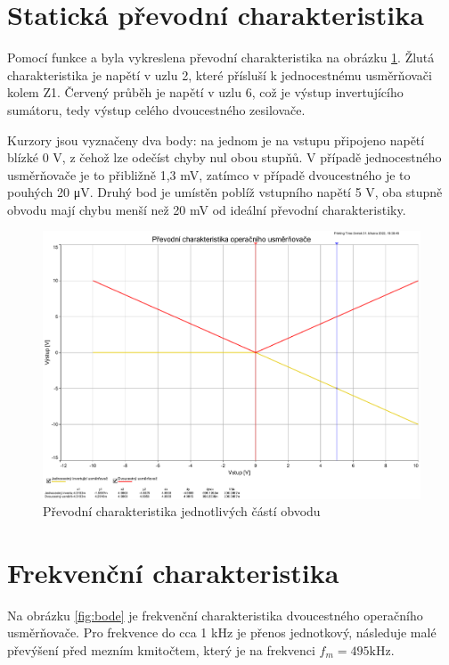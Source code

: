 \documentclass[twoside]{article}
\begin{document}
\section{Statická převodní charakteristika}

Pomocí funkce  a byla vykreslena převodní charakteristika na obrázku \ref{fig:prevod_char}.
Žlutá charakteristika je napětí v uzlu 2, které přísluší k jednocestnému usměrňovači kolem Z1.
Červený průběh je napětí v uzlu 6, což je výstup invertujícího sumátoru, tedy výstup celého dvoucestného zesilovače.

Kurzory jsou vyznačeny dva body: na jednom je na vstupu připojeno napětí blízké 0 \si{\volt}, z čehož lze odečíst
chyby nul obou stupňů. V případě jednocestného usměrňovače je to přibližně 1,3 \si{\milli\volt}, zatímco v případě dvoucestného
je to pouhých 20 \si{\micro\volt}.
Druhý bod je umístěn poblíž vstupního napětí 5 \si{\volt}, oba stupně obvodu mají chybu menší než 20 \si{\milli\volt}
od ideální převodní charakteristiky.


\begin{figure}[h!]
    \centering
    \includegraphics[width=0.55\linewidth]{prevod_char.pdf}
    \caption{Převodní charakteristika jednotlivých částí obvodu}
    \label{fig:prevod_char}
\end{figure}



\section{Frekvenční charakteristika}

Na obrázku \ref{fig:bode} je frekvenční charakteristika dvoucestného operačního usměrňovače.
Pro frekvence do cca 1 \si{\kilo\hertz} je přenos jednotkový, následuje malé převýšení před mezním kmitočtem,
který je na frekvenci $f_m = 495 \si{\kilo\hertz}$.
\end{document}
